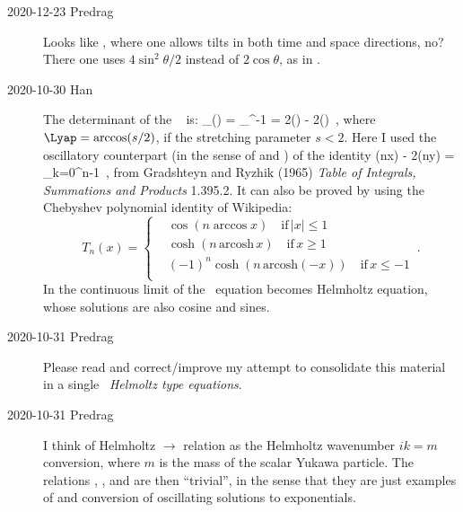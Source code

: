 \begin{description}
    \item[2020-12-23 Predrag]
Looks like , where one allows tilts in both time and space
directions, no? There one uses $4\sin^2\theta/2$ instead of
$2\cos\theta$, as in . %

	\item[2020-10-30 Han]
The determinant of the \jacobianOrb\  is:
\beq
\det\jMorb_{\period{}}(\theta)
= \prod_{}^{\period{}-1}
= 2\cos(\period{}\Lyap) - 2\cos(\period{}\theta)
\,,
where
$\Lyap = \arccos (s/2)$,
if the stretching parameter $s<2$.
Here I used the oscillatory counterpart (in the sense of
 and ) of the identity
\cos(nx) - 2\cos(ny) = \prod_{k=0}^{n-1}
\,,
from
{Gradshteyn and Ryzhik}
(1965) {\em Table of Integrals, Summations and Products}
1.395.2. It can also be proved by using the Chebyshev polynomial identity of
{Wikipedia}:
\[
T_n(x) =
\left\{\begin{aligned}
&\cos(n \arccos x)  \quad \text{if} \, |x| \leq 1\\
&\cosh(n \, \text{arcosh} \, x)  \quad \text{if} \, x \geq 1\\
&(-1)^n\cosh(n \, \text{arcosh} (-x))  \quad \text{if} \, x \leq -1\\
\end{aligned}\right .
\,.
\]
In the continuous limit of the \catlatt\ equation becomes Helmholtz
equation, whose solutions are also cosine and sines.

	\item[2020-10-31 Predrag]
Please read and correct/improve my attempt to consolidate this
material in a single ~{\em Helmoltz type equations}.

	\item[2020-10-31 Predrag]
I think of Helmholtz $\to$ {\sPe} relation as the Helmholtz wavenumber
$ik=m$ conversion, where $m$ is the mass of the scalar Yukawa particle.
The relations
,
,
and
are then ``trivial'', in the sense that they are just examples of
 and  conversion of
oscillating solutions to exponentials.


\end{description}
